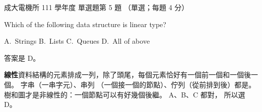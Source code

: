 \begin{pastexam}[label={px:ncku-111-ee-ds-05}]{成大電機所 111 學年度 單選題第 5 題}
（單選；每題 4 分）

Which of the following data structure is linear type?

A.~Strings \qquad B.~Lists \qquad C.~Queues \qquad D.~All of above
\end{pastexam}

\begin{pastsoln}
答案是 D。

\textbf{線性}資料結構的元素排成一列，除了頭尾，每個元素恰好有一個前一個和一個後一個。 字串（一串字元）、串列
（一個接一個的節點）、佇列（從前排到後）都是。 樹和圖才是非線性的：一個節點可以有好幾個後繼。 A、B、C 都對，
所以選 D。
\end{pastsoln}
